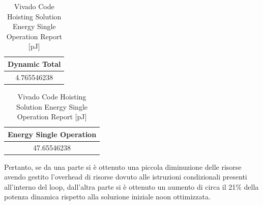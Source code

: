 \begin{table}[H]
    \centering
    \begin{minipage}[t]{0.45\linewidth}
        \centering
        \begin{tabular}{|c|}
            \hline
            \textbf{Dynamic Total} \\
            \hline
            4.765546238 \\
            \hline
        \end{tabular}
        \caption{Vivado Code Hoisting Solution Dynamic Power Report [mW]}
        \label{tab:vivado-code-hoisting-solution-dynamic-power-reproot}
    \end{minipage}
    \hfill
    \centering
    \begin{minipage}[t]{0.45\linewidth}
        \centering
        \begin{tabular}{|c|}
            \hline
            \textbf{Energy Single Operation} \\
            \hline
            47.65546238 \\
            \hline
        \end{tabular}
        \caption{Vivado Code Hoisting Solution Energy Single Operation Report [pJ]}
        \label{tab:vivado-code-hoisting-solution-energy-single-operation-reproot}
    \end{minipage}
\end{table}

Pertanto, se da una parte si è ottenuto una piccola diminuzione delle risorse avendo gestito l'overhead di risorse dovuto alle istruzioni condizionali presenti all'interno del loop, dall'altra parte si è ottenuto un aumento di circa il 21\% della potenza dinamica rispetto alla soluzione iniziale noon ottimizzata.